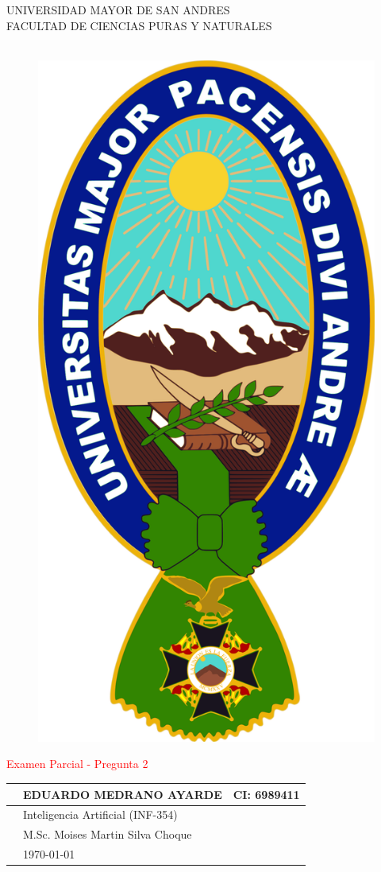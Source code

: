 
	\thispagestyle{empty}
	\begin{center}
		{\fontsize{20}{40}\selectfont UNIVERSIDAD MAYOR DE SAN ANDRES}\\
		\vspace*{0.2cm}
		{\fontsize{16}{32}\selectfont FACULTAD DE CIENCIAS PURAS Y NATURALES}\\
		{\fontsize{14}{28}\selectfont {\it CARRERA DE INFORMÁTICA}}\\
	\end{center}
	\begin{figure}[h]
	\centering
	\includegraphics[width=0.20\linewidth]{im/LOGO}
	\end{figure}
	\begin{center}
		
		
	{\textcolor{red}{\fontsize{24}{0}\selectfont Examen Parcial - Pregunta 2}}\\
	\end{center}
	\hspace*{0.1cm}
	\begin{center}
		\begin{tabular}{r l l}
			\toprule
			{\fontsize{16}{38}\selectfont {\bf Nombres:}} & {\fontsize{14}{38}\selectfont  EDUARDO MEDRANO AYARDE }&CI: 6989411 \\
			 
			
		 
		 
		 \toprule

			 
		 \toprule
			{\fontsize{16}{38}\selectfont {\bf Materia:}} & {\fontsize{14}{38}\selectfont Inteligencia Artificial (INF-354)}\\
			\toprule
			{\fontsize{16}{38}\selectfont {\bf Docente:}} & {\fontsize{14}{38}\selectfont M.Sc. Moises Martin Silva Choque}\\
			\toprule
			{\fontsize{16}{38}\selectfont {\bf Fecha:}} & {\fontsize{14}{38}\selectfont \today}\\
			\bottomrule
		\end{tabular}
	
	\end{center}
		
	
	 
	
	
	
	
